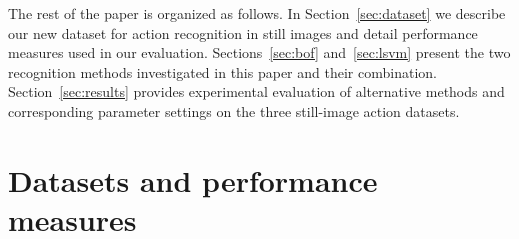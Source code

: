 \documentclass{bmvc2k}
\def\etal{\emph{et al}\bmvaOneDot}
\newcommand{\secnspc}{\vspace*{-3mm}}       %
\begin{document}
The rest of the paper is organized as follows. In Section~\ref{sec:dataset} we describe our new dataset for action recognition in still images and detail performance measures used in our evaluation. Sections~\ref{sec:bof} and~\ref{sec:lsvm} present the two recognition methods investigated in this paper and their combination. Section~\ref{sec:results} provides experimental evaluation of alternative methods and corresponding parameter settings on the three still-image action datasets. %





% 
%  



\secnspc
\section{Datasets and performance measures}
\secnspc
\label{sec:dataset}

\end{document}
